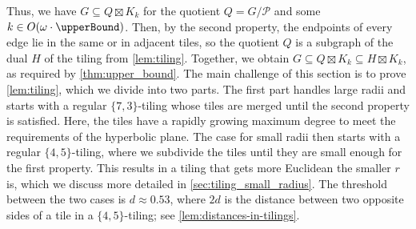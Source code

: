 \documentclass[11pt]{article}
\newtheorem{lemma}[theorem]{Lemma}
\providecommand{\todo}[2][]{}
\newcommand{\calP}{\ensuremath{\mathcal{P}}\xspace}
\newcommand{\Hyp}{\ensuremath{\mathbb{H}}\xspace}
\begin{document}
Thus, we have $ G \subseteq Q \boxtimes K_k $ for the quotient $ Q = G / \calP $ and some $ k \in {O(\omega \cdot \upperBound)} $.
Then, by the second property, the endpoints of every edge lie in the same or in adjacent tiles, so the quotient $ Q $ is a subgraph of the dual $ H $ of the tiling from \cref{lem:tiling}.
Together, we obtain $ G \subseteq Q \boxtimes K_k \subseteq H \boxtimes K_k $, as required by \cref{thm:upper_bound}.
%
The main challenge of this section is to prove \cref{lem:tiling}, which we divide into two parts.
The first part handles large radii and starts with a regular $ \{7, 3\} $-tiling whose tiles are merged until the second property is satisfied.
Here, the tiles have a rapidly growing maximum degree to meet the requirements of the hyperbolic plane.
The case for small radii then starts with a regular $ \{ 4, 5 \} $-tiling, where we subdivide the tiles until they are small enough for the first property.
This results in a tiling that gets more Euclidean the smaller $ r $ is, which we discuss more detailed in \cref{sec:tiling_small_radius}.
The threshold between the two cases is $ d \approx 0.53 $, where $ 2d $ is the distance between two opposite sides of a tile in a $ \{ 4, 5 \} $-tiling; see \cref{lem:distances-in-tilings}.
%
%
%
% 
%     
\end{document}
